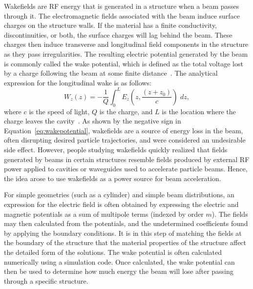 
Wakefields are RF energy that is generated in a structure when a beam passes through it. 
The electromagnetic fields
associated with the beam induce surface charges on the structure walls.
If the material has a finite conductivity, discontinuities, or both, the
surface charges will lag behind the beam. These charges then induce
transverse and longitudinal field components in the structure as they
pass irregularities. The resulting electric potential
generated by the beam is commonly called the wake potential, which
is defined as the total voltage lost by a charge following the beam
at some finite distance~\cite{SLACwakefields}. The analytical expression for the longitudinal wake is as follows:
\begin{equation}
W_z\left(z\right)= -\frac{1}{Q} \int_{0}^{L} E_z \left(z,\frac{\left(z+z_0\right)}{c}\right)\,\,dz,
\label{eq:wakepotential}
\end{equation} 
where $c$ is the speed of light, $Q$ is the charge, 
and $L$ is the location where the charge leaves the cavity~\cite{SLACwakefields}.
As shown by the negative sign in Equation~\ref{eq:wakepotential}, wakefields are a source of 
energy loss in the beam, often disrupting desired particle trajectories, 
and were considered an undesirable side effect.
However, people studying wakefields quickly realized that fields
generated by beams in certain structures resemble fields produced by external RF power 
applied to cavities or waveguides used to accelerate particle beams.
Hence, the idea arose to use wakefields as a power source for beam acceleration. 

For simple geometries (such as a cylinder) and simple beam distributions, 
an expression for the electric field is often obtained by expressing the 
electric and magnetic potentials as a sum of multipole terms (indexed by order $m$). 
The fields may then calculated from the potentials, and the undetermined coefficients 
found by applying the boundary conditions. It is in this step of matching the fields 
at the boundary of the structure that the material properties of the structure affect 
the detailed form of the solutions. The wake potential is 
often calculated numerically using a simulation code. Once calculated, 
the wake potential can then be used to determine how much energy the 
beam will lose after passing through a specific structure. 

